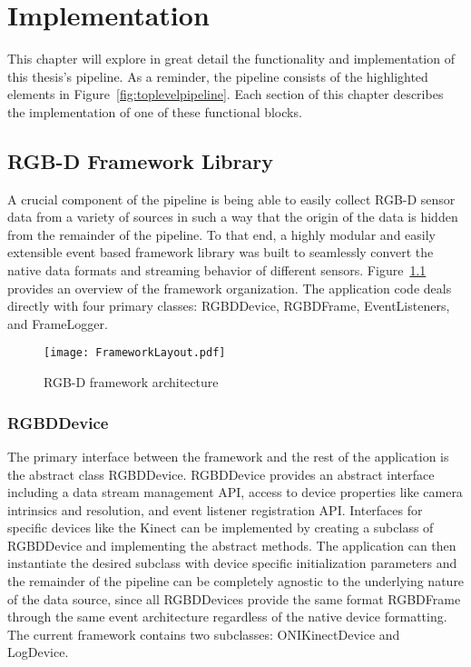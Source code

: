 \chapter{Implementation}
\label{chap:implementation}
This chapter will explore in great detail the functionality and implementation of this thesis's pipeline. As a reminder, the pipeline consists of the highlighted elements in Figure~\ref{fig:toplevelpipeline}. Each section of this chapter describes the implementation of one of these functional blocks.

\section{RGB-D Framework Library}
A crucial component of the pipeline is being able to easily collect RGB-D sensor data from a variety of sources in such a way that the origin of the data is hidden from the remainder of the pipeline. To that end, a highly modular and easily extensible event based framework library was built to seamlessly convert the native data formats and streaming behavior of different sensors. Figure~\ref{fig:rgbdframework} provides an overview of the framework organization. The application code deals directly with four primary classes: RGBDDevice, RGBDFrame, EventListeners, and FrameLogger.
\begin{figure}[ht]
    \centering
    \texttt{[image: FrameworkLayout.pdf]}
    \caption{RGB-D framework architecture}
    \label{fig:rgbdframework}
\end{figure}
\subsection{RGBDDevice}
The primary interface between the framework and the rest of the application is the abstract class RGBDDevice. RGBDDevice provides an abstract interface including a data stream management API, access to device properties like camera intrinsics and resolution, and event listener registration API. Interfaces for specific devices like the Kinect can be implemented by creating a subclass of RGBDDevice and implementing the abstract methods. The application can then instantiate the desired subclass with device specific initialization parameters and the remainder of the pipeline can be completely agnostic to the underlying nature of the data source, since all RGBDDevices provide the same format RGBDFrame through the same event architecture regardless of the native device formatting. The current framework contains two subclasses: ONIKinectDevice and LogDevice. 
